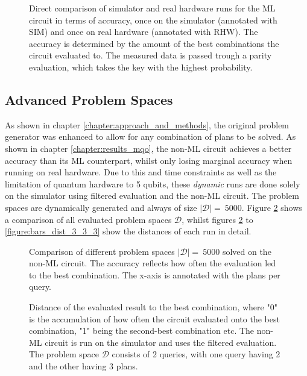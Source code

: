 \begin{figure}[!h]
    \centering
    \scalebox{\resultboxplot}{
        
    }
    \caption{Direct comparison of simulator and real hardware runs for the ML circuit in terms of accuracy, once on the simulator (annotated with SIM) and once on real hardware (annotated with RHW). The accuracy is determined by the amount of the best combinations the circuit evaluated to. The measured data is passed trough a parity evaluation, which takes the key with the highest probability.}
    \label{figure:blind_run_ml_circuit_p_acc}
\end{figure}

\newpage

\subsection{Advanced Problem Spaces}
\label{chapter:results_advanced_problem_spaces}
As shown in chapter \ref{chapter:approach_and_methods}, the original problem generator was enhanced to allow for any combination of plans to be solved. As shown in chapter \ref{chapter:results_mqo}, the non-ML circuit achieves a better accuracy than its ML counterpart, whilst only losing marginal accuracy when running on real hardware. Due to this and time constraints as well as the limitation of quantum hardware to 5 qubits, these \emph{dynamic} runs are done solely on the simulator using filtered evaluation and the non-ML circuit. The problem spaces are dynamically generated and always of size $\left|\mathcal{D}\right| =\ 5000$. Figure \ref{figure:overview_dynamic_problems} shows a comparison of all evaluated problem spaces $\mathcal{D}$, whilst figures \ref{figure:overview_dynamic_problems} to \ref{figure:bars_dist_3_3_3} show the distances of each run in detail.


\begin{figure}[!h]
    \centering
    \scalebox{\resultboxplot}{
        
    }
    \caption{Comparison of different problem spaces $\left|\mathcal{D}\right| =\ 5000$ solved on the non-ML circuit. The accuracy reflects how often the evaluation led to the best combination. The x-axis is annotated with the plans per query.}
    \label{figure:overview_dynamic_problems}
\end{figure}

\begin{figure}[!h]
    \centering
    \scalebox{\resultboxplot}{
        
    }
    \caption{Distance of the evaluated result to the best combination, where "0" is the accumulation of how often the circuit evaluated onto the best combination, "1" being the second-best combination etc. The non-ML circuit is run on the simulator and uses the filtered evaluation. The problem space $\mathcal{D}$ consists of 2 queries, with one query having 2 and the other having 3 plans.}
    \label{figure:bars_dist_2_3}
\end{figure}

